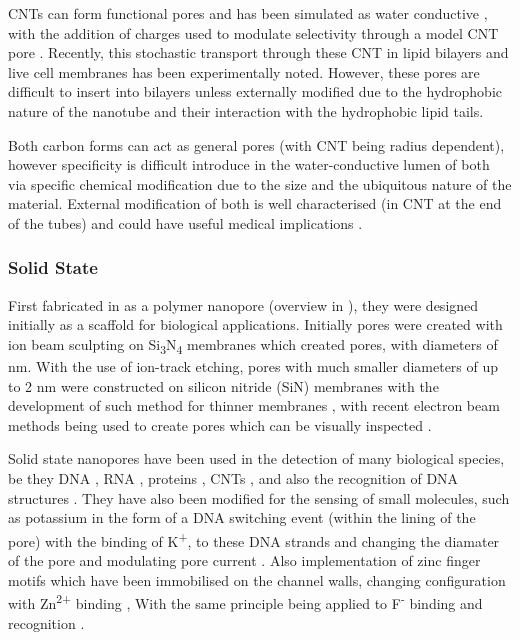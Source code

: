 CNTs can form functional pores and has been simulated as water conductive \cite{Hummer2001,Zhu2003}, with the addition of charges used to modulate selectivity through a model CNT pore \cite{Garcia-Fandino2012b}. Recently, this stochastic transport through these CNT in lipid bilayers and live cell membranes has been experimentally noted\cite{Geng2014}. However, these pores are difficult to insert into bilayers unless externally modified \cite{Pogodin2010} due to the hydrophobic nature of the nanotube and their interaction with the hydrophobic lipid tails. 

Both carbon forms can act as general pores (with CNT being radius dependent), however specificity is difficult introduce in the water-conductive lumen of both via specific chemical modification due to the size and the ubiquitous nature of the material. External modification of both is well characterised (in CNT at the end of the tubes) and could have useful medical implications \cite{Kuila2012,Vardharajula2012}.


\subsubsection{Solid State}

First fabricated in  as a polymer nanopore (overview in \cite{Dekker2007,Keyser2011a}), they were designed initially as a scaffold for biological applications. Initially pores were created with ion beam sculpting on Si\textsubscript{3}N\textsubscript{4} membranes which created pores, with diameters of  nm. With the use of ion-track etching, pores with much smaller diameters of up to 2 nm were constructed on silicon nitride (SiN) membranes \cite{Siwy2002} with the development of such method for thinner membranes \cite{Kuan2012}, with recent electron beam methods being used to create pores which can be visually inspected \cite{Storm2003}. 

Solid state nanopores have been used in the detection of many biological species, be they DNA \cite{Li2001,Fologea2005,Storm2005,Kowalczyk2010}, RNA \cite{Skinner2009}, proteins \cite{Han2006,Talaga2009,Martin2007}, CNTs \cite{Hall2011}, and also the recognition of DNA structures \cite{Kowalczyk2010,Wanunu2009}.  They have also been modified for the sensing of small molecules, such as potassium in the form of a DNA switching event (within the lining of the pore) with the binding of K\textsuperscript{+}, to these DNA strands and changing the diamater of the pore and modulating pore current \cite{Hou2009}. Also implementation of zinc finger motifs which have been immobilised on the channel walls, changing configuration with Zn\textsuperscript{2+} binding \cite{Tian2010}, With the same principle being applied to F\textsuperscript{-} binding and recognition \cite{Liu2014}.

